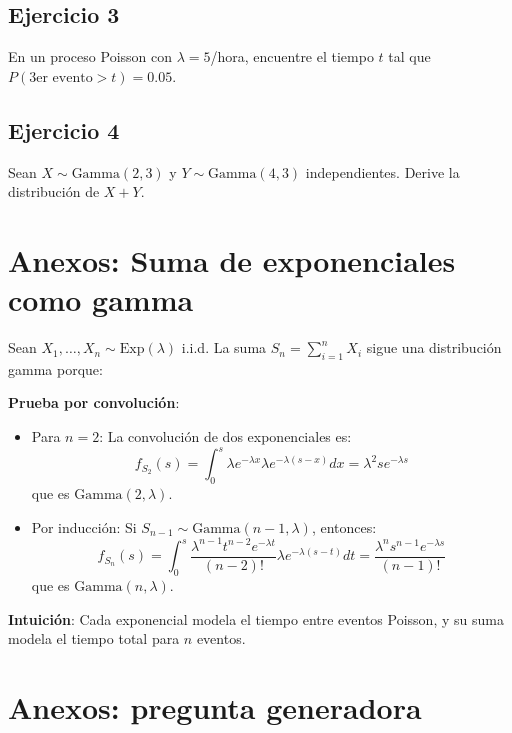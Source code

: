 \documentclass[letterpaper]{article}
\begin{document}
	\subsection{Ejercicio 3}
	En un proceso Poisson con $\lambda=5$/hora, encuentre el tiempo $t$ tal que $P(\text{3er evento} > t) = 0.05$.
	
	\subsection{Ejercicio 4}
	Sean $X \sim \text{Gamma}(2, 3)$ y $Y \sim \text{Gamma}(4, 3)$ independientes. Derive la distribución de $X+Y$.
	
\section*{Anexos: Suma de exponenciales como gamma}
Sean $X_1, \ldots, X_n \sim \text{Exp}(\lambda)$ i.i.d. La suma $S_n = \sum_{i=1}^n X_i$ sigue una distribución gamma porque:

\textbf{Prueba por convolución}:
\begin{itemize}
	\item Para $n=2$: La convolución de dos exponenciales es:
	\[ f_{S_2}(s) = \int_0^s \lambda e^{-\lambda x} \lambda e^{-\lambda (s-x)} dx = \lambda^2 s e^{-\lambda s} \]
	que es $\text{Gamma}(2, \lambda)$.
	
	\item Por inducción: Si $S_{n-1} \sim \text{Gamma}(n-1, \lambda)$, entonces:
	\[ f_{S_n}(s) = \int_0^s \frac{\lambda^{n-1} t^{n-2} e^{-\lambda t}}{(n-2)!} \lambda e^{-\lambda (s-t)} dt = \frac{\lambda^n s^{n-1} e^{-\lambda s}}{(n-1)!} \]
	que es $\text{Gamma}(n, \lambda)$.
\end{itemize}

\textbf{Intuición}: Cada exponencial modela el tiempo entre eventos Poisson, y su suma modela el tiempo total para $n$ eventos.
	
\section*{Anexos: pregunta generadora}
\end{document}
